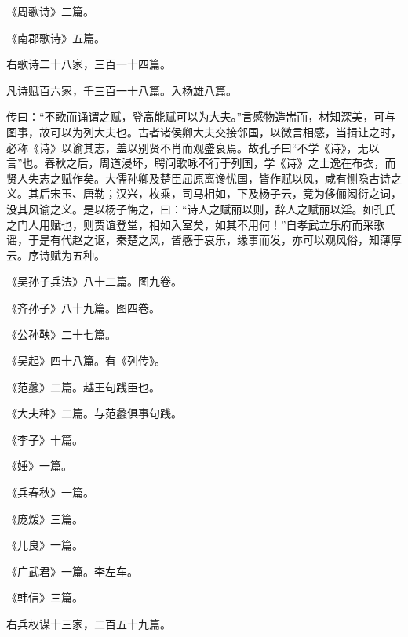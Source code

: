 \documentclass[12pt,UTF8]{ctexbook}
\begin{document}
《周歌诗》二篇。



《南郡歌诗》五篇。



右歌诗二十八家，三百一十四篇。



凡诗赋百六家，千三百一十八篇。入杨雄八篇。



传曰：“不歌而诵谓之赋，登高能赋可以为大夫。”言感物造耑而，材知深美，可与图事，故可以为列大夫也。古者诸侯卿大夫交接邻国，以微言相感，当揖让之时，必称《诗》以谕其志，盖以别贤不肖而观盛衰焉。故孔子曰“不学《诗》，无以言”也。春秋之后，周道浸坏，聘问歌咏不行于列国，学《诗》之士逸在布衣，而贤人失志之赋作矣。大儒孙卿及楚臣屈原离谗忧国，皆作赋以风，咸有恻隐古诗之义。其后宋玉、唐勒；汉兴，枚乘，司马相如，下及杨子云，竞为侈俪闳衍之词，没其风谕之义。是以杨子悔之，曰：“诗人之赋丽以则，辞人之赋丽以淫。如孔氏之门人用赋也，则贾谊登堂，相如入室矣，如其不用何！”自孝武立乐府而采歌谣，于是有代赵之讴，秦楚之风，皆感于哀乐，缘事而发，亦可以观风俗，知薄厚云。序诗赋为五种。



《吴孙子兵法》八十二篇。图九卷。



《齐孙子》八十九篇。图四卷。



《公孙鞅》二十七篇。



《吴起》四十八篇。有《列传》。



《范蠡》二篇。越王句践臣也。



《大夫种》二篇。与范蠡俱事句践。



《李子》十篇。



《娷》一篇。



《兵春秋》一篇。



《庞煖》三篇。



《儿良》一篇。



《广武君》一篇。李左车。



《韩信》三篇。



右兵权谋十三家，二百五十九篇。
\end{document}

